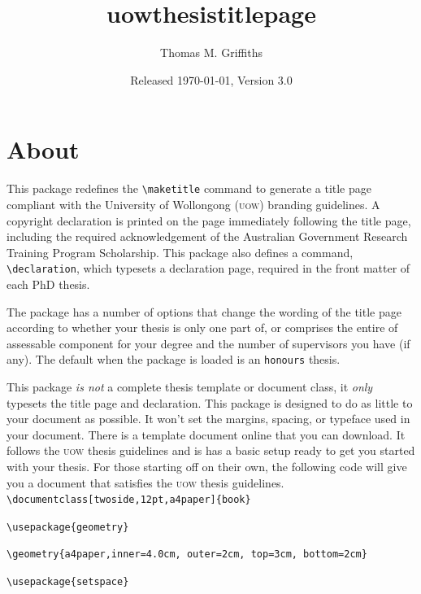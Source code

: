 \documentclass[12pt,oneside]{article}
\newcommand{\option}[1]{\texttt{\color{UOWblue}#1}}
\newcommand{\command}[1]{\texttt{\color{UOWred}#1}}
\newcommand{\comoptions}[1]{\texttt{\color{UOWdarkblue}#1}}
\begin{document}
    
\title{\textsf{uowthesistitlepage}}
\author{\small Thomas M. Griffiths}
\date{Released \today, Version 3.0}

\maketitle

\tableofcontents

\section{About}
This package redefines the \command{\textbackslash{}maketitle} command to generate a title page compliant with the University of Wollongong (\textsc{uow}) branding guidelines. A copyright declaration is printed on the page immediately following the title page, including the required acknowledgement of the Australian Government Research Training Program Scholarship. This package also defines a command, \command{\textbackslash{}declaration}, which typesets a declaration page, required in the front matter of each PhD thesis. 

The package has a number of options that change the wording of the title page according to whether your thesis is only one part of, or comprises the entire of assessable component for your degree and the number of supervisors you have (if any). The default when the package is loaded is an \option{honours} thesis.

This package \emph{is not} a complete thesis template or document class, it \emph{only} typesets the title page and declaration. This package is designed to do as little to your document as possible. It won't set the margins, spacing, or typeface used in your document. There is a template document online that you can download. It follows the \textsc{uow} thesis guidelines and is has a basic setup ready to get you started with your thesis. For those starting off on their own, the following code will give you a document that satisfies the \textsc{uow} thesis guidelines.\\

\command{\textbackslash{}documentclass}\option{[twoside,12pt,a4paper]}\comoptions{\{book\}}

\command{\textbackslash{}usepackage}\comoptions{\{geometry\}}

\command{\textbackslash{}geometry}\comoptions{\{a4paper,inner=4.0cm, outer=2cm, top=3cm, bottom=2cm\}}

\command{\textbackslash{}usepackage}\comoptions{\{setspace\}}
\end{document}
